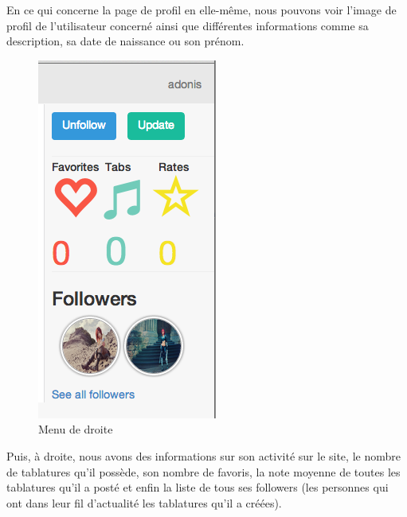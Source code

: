 En ce qui concerne la page de profil en elle-même, nous pouvons voir l'image de profil de l'utilisateur concerné ainsi que différentes informations comme sa description, sa date de naissance ou son prénom. \\

\begin{figure}[H]
\centering
\includegraphics[scale=0.5]{rightWEB}
\caption{Menu de droite}
\end{figure}

Puis, à droite, nous avons des informations sur son activité sur le site, le nombre de tablatures qu'il possède, son nombre de favoris, la note moyenne de toutes les tablatures qu'il a posté et enfin la liste de tous ses followers (les personnes qui ont dans leur fil d'actualité les tablatures qu'il a créées).
